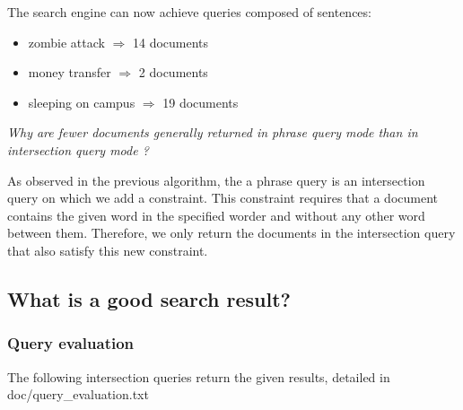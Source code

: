 The search engine can now achieve queries composed of sentences:
\begin{itemize}
    \item zombie attack $\Rightarrow$ 14 documents
    \item money transfer $\Rightarrow$ 2 documents
    \item sleeping on campus $\Rightarrow$ 19 documents
\end{itemize}

\textit{Why are fewer documents generally returned in phrase query mode than in intersection query mode ?}

As observed in the previous algorithm, the a phrase query is an intersection query on which we add a constraint. This constraint requires that a document contains the given word in the specified worder and without any other word between them. Therefore, we only return the documents in the intersection query that also satisfy this new constraint.


\subsection{What is a good search result?}
\subsubsection{Query evaluation}
The following intersection queries return the given results, detailed in doc/query\_evaluation.txt

